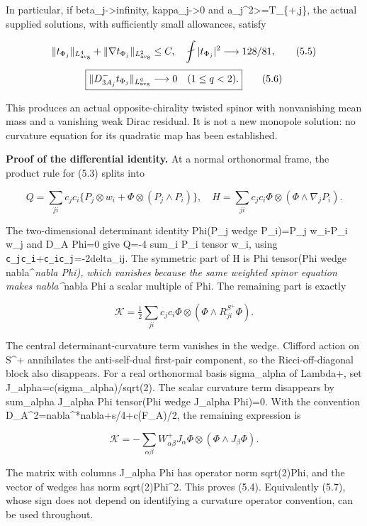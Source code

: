 \documentclass[
  10pt,
]{article}
\begin{document}
In particular, if beta\_j-\textgreater infinity, kappa\_j-\textgreater0
and a\_j\^{}2\textgreater=T\_\{+,j\}, the actual supplied solutions,
with sufficiently small allowances, satisfy

\[
 \|t_{\Phi_j}\|_{L^4_{\rm avg}}+
 \|\nabla t_{\Phi_j}\|_{L^2_{\rm avg}}\le C,
 \quad \fint|t_{\Phi_j}|^2\longrightarrow128/81,
                                                        \tag{5.5}
\] \[
 \boxed{\|D^-_{3A_j}t_{\Phi_j}\|_{L^q_{\rm avg}}
          \longrightarrow0\quad(1\le q<2).}            \tag{5.6}
\]

This produces an actual opposite-chirality twisted spinor with
nonvanishing mean mass and a vanishing weak Dirac residual. It is not a
new monopole solution: no curvature equation for its quadratic map has
been established.

\textbf{Proof of the differential identity.} At a normal orthonormal
frame, the product rule for (5.3) splits into

\[
 Q=\sum_{ji}c_jc_i\{P_j\otimes w_i+
                       \Phi\otimes(P_j\wedge P_i)\},
 \quad H=\sum_{ji}c_jc_i\Phi\otimes(\Phi\wedge\nabla_jP_i).
\]

The two-dimensional determinant identity Phi(P\_j wedge P\_i)=P\_j
w\_i-P\_i w\_j and D\_A Phi=0 give Q=-4 sum\_i P\_i tensor w\_i, using
\nolinkurl{c_jc_i}+\nolinkurl{c_ic_j}=-2delta\_ij. The symmetric part of H is Phi tensor(Phi
wedge nabla\^{}\emph{nabla Phi), which vanishes because the same
weighted spinor equation makes nabla\^{}}nabla Phi a scalar multiple of
Phi. The remaining part is exactly

\[
 \mathcal K=\tfrac12\sum_{ji}c_jc_i\Phi\otimes
                   (\Phi\wedge R^{S^+}_{ji}\Phi).       \tag{5.7}
\]

The central determinant-curvature term vanishes in the wedge. Clifford
action on S\^{}+ annihilates the anti-self-dual first-pair component, so
the Ricci-off-diagonal block also disappears. For a real orthonormal
basis sigma\_alpha of Lambda+, set J\_alpha=c(sigma\_alpha)/sqrt(2). The
scalar curvature term disappears by sum\_alpha J\_alpha Phi tensor(Phi
wedge J\_alpha Phi)=0. With the convention
D\_A\^{}2=nabla\^{}*nabla+s/4+c(F\_A)/2, the remaining expression is

\[
 \mathcal K=-\sum_{\alpha\beta}W^+_{\alpha\beta}
                  J_\alpha\Phi\otimes(\Phi\wedge J_\beta\Phi).
\]

The matrix with columns J\_alpha Phi has operator norm
sqrt(2)\textbar Phi\textbar, and the vector of wedges has norm
sqrt(2)\textbar Phi\textbar\^{}2. This proves (5.4). Equivalently (5.7),
whose sign does not depend on identifying a curvature operator
convention, can be used throughout.
\end{document}
